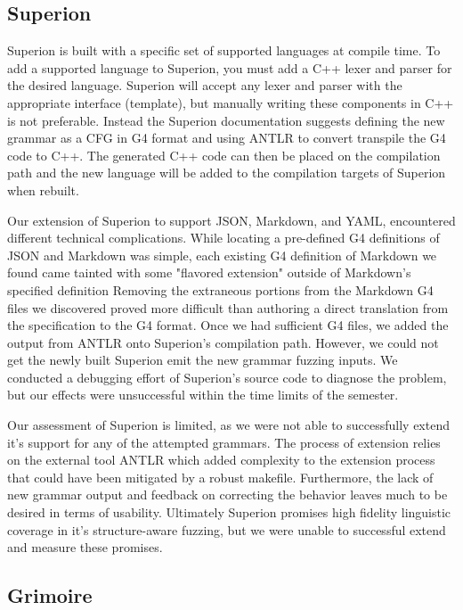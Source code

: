 \documentclass[12pt]{diazessay}
\begin{document}
\subsection*{Superion}

Superion is built with a specific set of supported languages at compile time.
To add a supported language to Superion, you must add a C++ lexer and parser for the desired language.
Superion will accept any lexer and parser with the appropriate interface (template), but manually writing these components in C++ is not preferable.
Instead the Superion documentation suggests defining the new grammar as a CFG in G4 format and using ANTLR\cite{parr2013definitive} to convert transpile the G4 code to C++.
The generated C++ code can then be placed on the compilation path and the new language will be added to the compilation targets of Superion when rebuilt.

Our extension of Superion to support JSON, Markdown, and YAML, encountered different technical complications.
While locating a pre-defined G4 definitions of JSON and Markdown was simple, each existing G4 definition of Markdown we found came tainted with some "flavored extension" outside of Markdown's specified definition
Removing the extraneous portions from the Markdown G4 files we discovered proved more difficult than authoring a direct translation from the specification to the G4 format.
Once we had sufficient G4 files, we added the output from ANTLR onto Superion's compilation path.
However, we could not get the newly built Superion emit the new grammar fuzzing inputs.
We conducted a debugging effort of Superion's source code to diagnose the problem, but our effects were unsuccessful within the time limits of the semester.

Our assessment of Superion is limited, as we were not able to successfully extend it's support for any of the attempted grammars.
The process of extension relies on the external tool ANTLR which added complexity to the extension process that could have been mitigated by a robust makefile.
Furthermore, the lack of new grammar output and feedback on correcting the behavior leaves much to be desired in terms of usability.
Ultimately Superion promises high fidelity linguistic coverage in it's structure-aware fuzzing, but we were unable to successful extend and measure these promises.

\subsection*{Grimoire}
\end{document}
